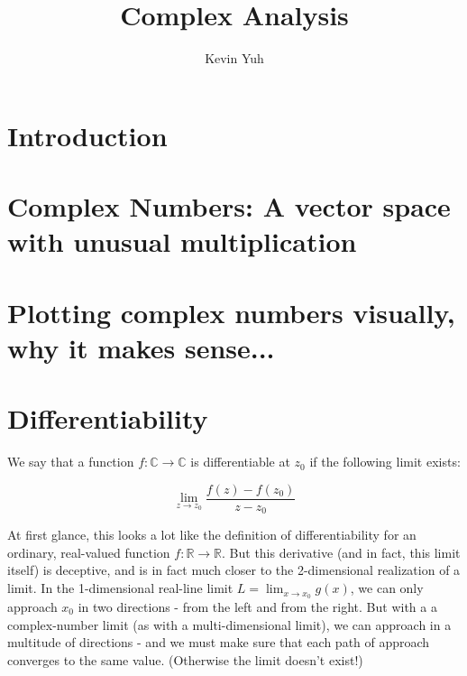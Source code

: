 \documentclass{article}
\title{Complex Analysis}
\author{Kevin Yuh}
\begin{document}
\maketitle

\section{Introduction}


\section{Complex Numbers: A vector space with unusual multiplication}


\section{Plotting complex numbers visually, why it makes sense...}

\section{Differentiability}


We say that a function $f: \mathbb{C} \rightarrow \mathbb{C}$ is differentiable at $z_0$ if the following limit exists:

\begin{equation}
\lim_{z \to z_0}\frac{f(z)-f(z_0)}{z-z_0}
\end{equation}

At first glance, this looks a lot like the definition of differentiability for an ordinary, real-valued function $f: \mathbb{R} \rightarrow \mathbb{R}$. But this derivative (and in fact, this limit itself) is deceptive, and is in fact much closer to the 2-dimensional realization of a limit. In the 1-dimensional real-line limit $L = \lim_{x \to x_0}g(x)$, we can only approach $x_0$ in two directions - from the left and from the right. But with a a complex-number limit (as with a multi-dimensional limit), we can approach in a multitude of directions - and we must make sure that each path of approach converges to the same value. (Otherwise the limit doesn't exist!)
\end{document}
